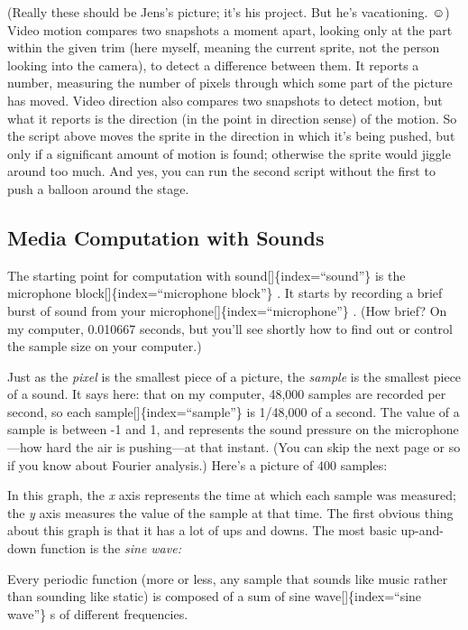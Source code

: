 \documentclass[
  letterpaper,
]{book}
\begin{document}
(Really these should be Jens's picture; it's his project. But he's
vacationing. ☺) Video motion compares two snapshots a moment apart,
looking only at the part within the given trim (here myself, meaning the
current sprite, not the person looking into the camera), to detect a
difference between them. It reports a number, measuring the number of
pixels through which some part of the picture has moved. Video direction
also compares two snapshots to detect motion, but what it reports is the
direction (in the point in direction sense) of the motion. So the script
above moves the sprite in the direction in which it's being pushed, but
only if a significant amount of motion is found; otherwise the sprite
would jiggle around too much. And yes, you can run the second script
without the first to push a balloon around the stage.

\subsection{Media Computation with
Sounds}\label{media-computation-with-sounds}

The starting point for computation with sound{[}{]}\{index=``sound''\}
is the microphone block{[}{]}\{index=``microphone block''\} . It starts
by recording a brief burst of sound from your
microphone{[}{]}\{index=``microphone''\} . (How brief? On my computer,
0.010667 seconds, but you'll see shortly how to ﬁnd out or control the
sample size on your computer.)

Just as the \emph{pixel} is the smallest piece of a picture, the
\emph{sample} is the smallest piece of a sound. It says here: that on my
computer, 48,000 samples are recorded per second, so each
sample{[}{]}\{index=``sample''\} is 1/48,000 of a second. The value of a
sample is between -1 and 1, and represents the sound pressure on the
microphone---how hard the air is pushing---at that instant. (You can
skip the next page or so if you know about Fourier analysis.) Here's a
picture of 400 samples:

In this graph, the \emph{x} axis represents the time at which each
sample was measured; the \emph{y} axis measures the value of the sample
at that time. The first obvious thing about this graph is that it has a
lot of ups and downs. The most basic up-and-down function is the
\emph{sine wave:}

Every periodic function (more or less, any sample that sounds like music
rather than sounding like static) is composed of a sum of sine
wave{[}{]}\{index=``sine wave''\} s of different frequencies.
\end{document}
